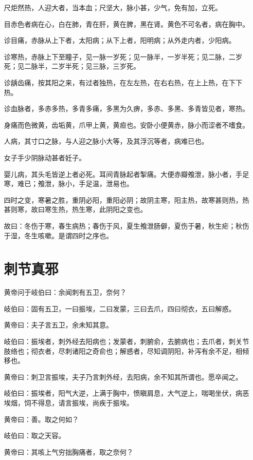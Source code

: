 \documentclass[a4paper,12pt,UTF8,twoside]{ctexbook}
\begin{document}
	尺炬然热，人迎大者，当本血；尺坚大，脉小甚，少气，免有加，立死。
	
	目赤色者病在心，白在肺，青在肝，黄在脾，黑在肾。黄色不可名者，病在胸中。
	
	诊目痛，赤脉从上下者，太阳病；从下上者，阳明病；从外走内者，少阳病。
	
	诊寒热，赤脉上下至瞳子，见一脉一岁死；见一脉半，一岁半死；见二脉，二岁死；见二脉半，二岁半死；见三脉，三岁死。
	
	诊龋齿痛，按其阳之来，有过者独热，在左左热，在右右热，在上上热，在下下热。
	
	诊血脉者，多赤多热，多青多痛，多黑为久痹，多赤、多黑、多青皆见者，寒热。
	
	身痛而色微黄，齿垢黄，爪甲上黄，黄疸也。安卧小便黄赤，脉小而涩者不嗜食。
	
	人病，其寸口之脉，与人迎之脉小大等，及其浮沉等者，病难已也。
	
	女子手少阴脉动甚者妊子。
	
	婴儿病，其头毛皆逆上者必死。耳间青脉起者掣痛。大便赤瓣飧泄，脉小者，手足寒，难已；飧泄，脉小，手足温，泄易也。
	
	四时之变，寒暑之胜，重阴必阳，重阳必阴；故阴主寒，阳主热，故寒甚则热，热甚则寒，故曰寒生热，热生寒，此阴阳之变也。
	
	故曰：冬伤于寒，春生病热；春伤于风，夏生飧泄肠僻，夏伤于暑，秋生疟；秋伤于湿，冬生咳嗽。是谓四时之序也。
	
	\chapter{刺节真邪}
	
	黄帝问于岐伯曰：余闻刺有五卫，奈何？
	
	岐伯曰：固有五卫，一曰振埃，二曰发蒙，三曰去爪，四曰彻衣，五曰解惑。
	
	黄帝曰：夫子言五卫，余未知其意。
	
	岐伯曰：振埃者，刺外经去阳病也；发蒙者，刺腑俞，去腑病也；去爪者，刺关节肢络也；彻衣者，尽刺诸阳之奇俞也；解惑者，尽知调阴阳，补泻有余不足，相倾移也。
	
	黄帝曰：刺卫言振埃，夫子乃言刺外经，去阳病，余不知其所谓也。愿卒闻之。
	
	岐伯曰：振埃者，阳气大逆，上满于胸中，愤瞋肩息，大气逆上，喘喝坐伏，病恶埃烟，饲不得息，请言振埃，尚疾于振埃。
	
	黄帝曰：善。取之何如？
	
	岐伯曰：取之天容。
	
	黄帝曰：其咳上气穷拙胸痛者，取之奈何？
	
\end{document}
